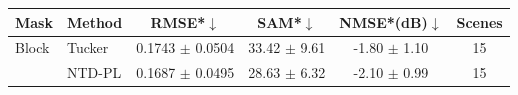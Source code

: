 \begin{tabular}{@{}l l c c c c@{}}
\toprule
Mask & Method & RMSE*$\downarrow$ & SAM*$\downarrow$ & NMSE*(dB)$\downarrow$ & Scenes\\
\midrule
Block & Tucker & 0.1743 $\pm$ 0.0504 & 33.42 $\pm$ 9.61 & -1.80 $\pm$ 1.10 & 15\\
 & NTD-PL & 0.1687 $\pm$ 0.0495 & 28.63 $\pm$ 6.32 & -2.10 $\pm$ 0.99 & 15\\
\bottomrule
\end{tabular}
